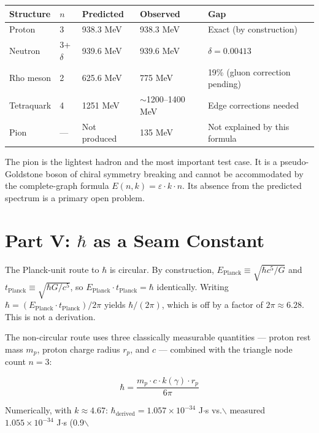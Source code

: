 \documentclass[11pt,letterpaper]{article}
\begin{document}
\begin{center}
\begin{tabular}{lllll}
\toprule
\textbf{Structure} & \(n\) & \textbf{Predicted} & \textbf{Observed} & \textbf{Gap}\\[0pt]
\midrule
Proton & 3 & 938.3 MeV & 938.3 MeV & Exact (by construction)\\[0pt]
Neutron & 3+\(\delta\) & 939.6 MeV & 939.6 MeV & \(\delta = 0.00413\)\\[0pt]
Rho meson & 2 & 625.6 MeV & 775 MeV & 19\% (gluon correction pending)\\[0pt]
Tetraquark & 4 & 1251 MeV & \(\sim\)1200--1400 MeV & Edge corrections needed\\[0pt]
Pion & --- & Not produced & 135 MeV & Not explained by this formula\\[0pt]
\bottomrule
\end{tabular}
\end{center}

The pion is the lightest hadron and the most important test case. It is a pseudo-Goldstone boson of chiral symmetry breaking and cannot be accommodated by the complete-graph formula \(E(n,k) = \varepsilon \cdot k \cdot n\). Its absence from the predicted spectrum is a primary open problem.

\section{Part V: \(\hbar\) as a Seam Constant}
\label{sec:org63ff2e1}

The Planck-unit route to \(\hbar\) is circular. By construction, \(E_\text{Planck} \equiv \sqrt{\hbar c^5/G}\) and \(t_\text{Planck} \equiv \sqrt{\hbar G/c^5}\), so \(E_\text{Planck} \cdot t_\text{Planck} = \hbar\) identically. Writing \(\hbar = (E_\text{Planck} \cdot t_\text{Planck})/2\pi\) yields \(\hbar/(2\pi)\), which is off by a factor of \(2\pi \approx 6.28\). This is not a derivation.

The non-circular route uses three classically measurable quantities --- proton rest mass \(m_p\), proton charge radius \(r_p\), and \(c\) --- combined with the triangle node count \(n = 3\):

\begin{equation}
\hbar = \frac{m_p \cdot c \cdot k(\gamma) \cdot r_p}{6\pi}
\end{equation}

Numerically, with \(k \approx 4.67\): \(\hbar_\text{derived} = 1.057 \times 10^{-34}\) J\(\cdot\)s vs.$\backslash$ measured \(1.055 \times 10^{-34}\) J\(\cdot\)s (0.9$\backslash$%
\end{document}
